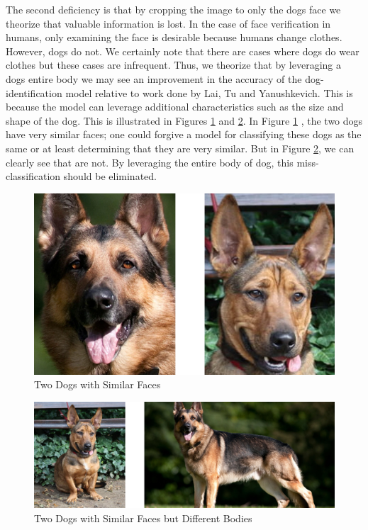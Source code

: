 \documentclass{article}
\begin{document}
The second deficiency is that by cropping the image to only the dogs face we theorize that valuable information is lost.  In the case of face verification in humans, only examining the face is desirable because humans change clothes.  However, dogs do not.  We certainly note that there are cases where dogs do wear clothes but these cases are infrequent.  Thus, we theorize that by leveraging a dogs entire body we may see an improvement in the accuracy of the dog-identification model relative to work done by  Lai, Tu and Yanushkevich.  This is because the model can leverage additional characteristics such as the size and shape of the dog.  This is illustrated in Figures \ref{fig:x similar faces} and \ref{fig:x different bodies}.  In Figure \ref{fig:x similar faces} , the two dogs have very similar faces; one could forgive a model for classifying these dogs as the same or at least determining that they are very similar.  But in Figure \ref{fig:x different bodies}, we can clearly see that are not.  By leveraging the entire body of dog, this miss-classification should be eliminated.

\begin{figure}[h]
\centering
	\includegraphics{final-report-images/similar_faces.png}
\caption{Two Dogs with Similar Faces}
\label{fig:x similar faces}
\end{figure}


\begin{figure}[h]
\centering
	\includegraphics{final-report-images/different_bodies.png}
\caption{Two Dogs with Similar Faces but Different Bodies}
\label{fig:x different bodies}
\end{figure}
\end{document}
